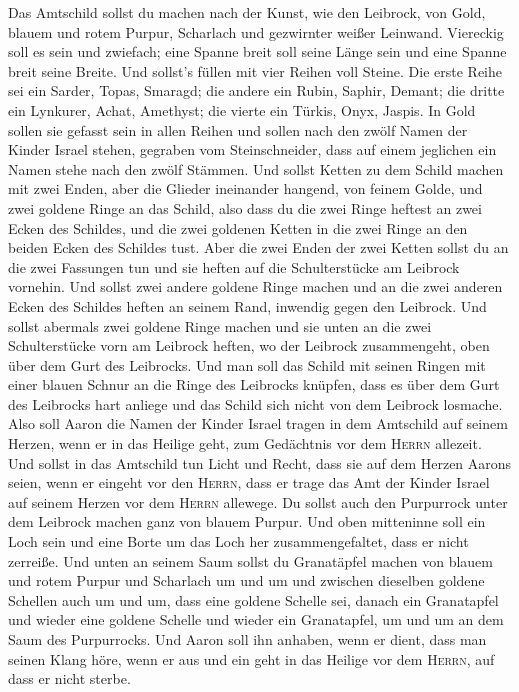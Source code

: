  Das Amtschild sollst du machen nach der Kunst, wie den
Leibrock, von Gold, blauem und rotem Purpur, Scharlach und gezwirnter
weißer Leinwand.  Viereckig soll es sein und zwiefach;
eine Spanne breit soll seine Länge sein und eine Spanne breit seine
Breite.  Und sollst's füllen mit vier Reihen voll Steine.
Die erste Reihe sei ein Sarder, Topas, Smaragd;  die
andere ein Rubin, Saphir, Demant;  die dritte ein
Lynkurer, Achat, Amethyst;  die vierte ein Türkis, Onyx,
Jaspis. In Gold sollen sie gefasst sein in allen Reihen 
und sollen nach den zwölf Namen der Kinder Israel stehen, gegraben vom
Steinschneider, dass auf einem jeglichen ein Namen stehe nach den zwölf
Stämmen.  Und sollst Ketten zu dem Schild machen mit zwei
Enden, aber die Glieder ineinander hangend, von feinem Golde,
 und zwei goldene Ringe an das Schild, also dass du die
zwei Ringe heftest an zwei Ecken des Schildes,  und die
zwei goldenen Ketten in die zwei Ringe an den beiden Ecken des Schildes
tust.  Aber die zwei Enden der zwei Ketten sollst du an
die zwei Fassungen tun und sie heften auf die Schulterstücke am Leibrock
vornehin.  Und sollst zwei andere goldene Ringe machen
und an die zwei anderen Ecken des Schildes heften an seinem Rand,
inwendig gegen den Leibrock.  Und sollst abermals zwei
goldene Ringe machen und sie unten an die zwei Schulterstücke vorn am
Leibrock heften, wo der Leibrock zusammengeht, oben über dem Gurt des
Leibrocks.  Und man soll das Schild mit seinen Ringen mit
einer blauen Schnur an die Ringe des Leibrocks knüpfen, dass es über dem
Gurt des Leibrocks hart anliege und das Schild sich nicht von dem
Leibrock losmache.  Also soll Aaron die Namen der Kinder
Israel tragen in dem Amtschild auf seinem Herzen, wenn er in das Heilige
geht, zum Gedächtnis vor dem \textsc{Herrn} allezeit. 
Und sollst in das Amtschild tun Licht und Recht, dass sie auf dem Herzen
Aarons seien, wenn er eingeht vor den \textsc{Herrn}, dass er trage das
Amt der Kinder Israel auf seinem Herzen vor dem \textsc{Herrn} allewege.
 Du sollst auch den Purpurrock unter dem Leibrock machen
ganz von blauem Purpur.  Und oben mitteninne soll ein
Loch sein und eine Borte um das Loch her zusammengefaltet, dass er nicht
zerreiße.  Und unten an seinem Saum sollst du Granatäpfel
machen von blauem und rotem Purpur und Scharlach um und um und zwischen
dieselben goldene Schellen auch um und um,  dass eine
goldene Schelle sei, danach ein Granatapfel und wieder eine goldene
Schelle und wieder ein Granatapfel, um und um an dem Saum des
Purpurrocks.  Und Aaron soll ihn anhaben, wenn er dient,
dass man seinen Klang höre, wenn er aus und ein geht in das Heilige vor
dem \textsc{Herrn}, auf dass er nicht sterbe.

